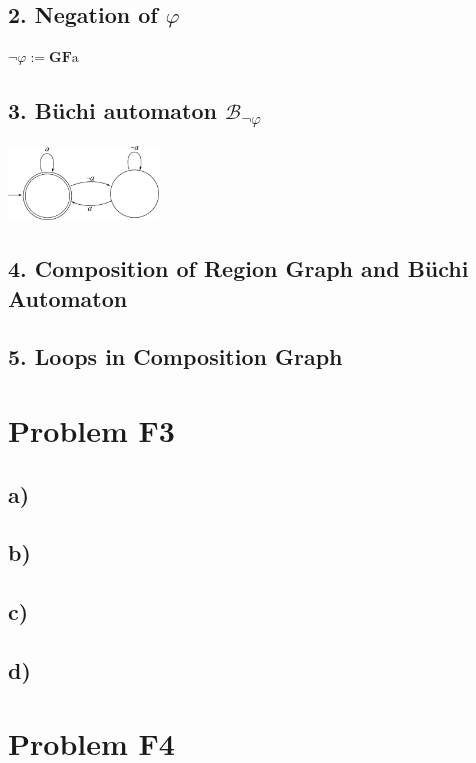 \documentclass[12pt]{article}
\begin{document}
\subsection*{2. Negation of $\varphi$ }
$\neg \varphi := \mathbf{G} \mathbf{F} \text{a}$

\subsection*{3. Büchi automaton $\mathcal{B}_{\neg \varphi}$}

\includegraphics[width=0.3\textwidth]{images/buchi_aut.pdf}

\subsection*{4. Composition of Region Graph and Büchi Automaton}

\vspace*{14cm}

\subsection*{5. Loops in Composition Graph}

\newpage

\section*{Problem F3}
\subsection*{a)}


\subsection*{b)}


\subsection*{c)}


\subsection*{d)}



\section*{Problem F4}
\end{document}
